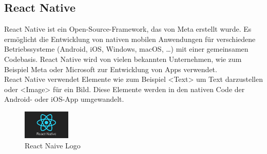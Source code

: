 \subsection{React Native}
\label{sec:reactnative}

React Native ist ein \Gls{Open-Source}-\Gls*{Framework}, das von Meta erstellt wurde. Es ermöglicht die Entwicklung von nativen mobilen Anwendungen für verschiedene Betriebssysteme (Android, iOS, Windows, macOS, …) mit einer gemeinsamen Codebasis. React Native wird von vielen bekannten Unternehmen, wie zum Beispiel Meta oder Microsoft zur Entwicklung von Apps verwendet.\\
React Native verwendet Elemente wie zum Beispiel <Text> um Text darzustellen oder <Image> für ein Bild. Diese Elemente werden in den nativen Code der Android- oder iOS-App umgewandelt.  \\
\begin{figure}[H]
    \centering
    \includegraphics[width=0.2\textwidth]{images/reactnativelogo.png}
    \caption{React Naive Logo }
    \label{fig:reactnativelogo}
\end{figure}
